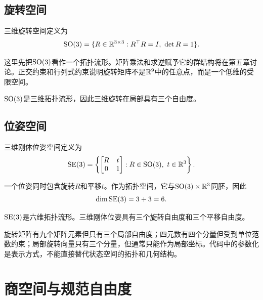 \subsection{旋转空间}

\begin{definition}[特殊正交群]
三维旋转空间定义为
\[
    \operatorname{SO}(3)
    =
    \{R\in\mathbb{R}^{3\times3}:R^\top R=I,\ \det R=1\}.
\]
\end{definition}

这里先把$\SO(3)$看作一个拓扑流形。矩阵乘法和求逆赋予它的群结构将在第五章讨论。正交约束和行列式约束说明旋转矩阵不是$\mathbb{R}^9$中的任意点，而是一个低维的受限空间。

\begin{theorem}[$\SO(3)$的维数]
$\SO(3)$是三维拓扑流形，因此三维旋转在局部具有三个自由度。
\end{theorem}

\subsection{位姿空间}

\begin{definition}[特殊欧氏群]
三维刚体位姿空间定义为
\[
    \operatorname{SE}(3)
    =
    \left\{
    \begin{bmatrix}
        R&t\\
        0&1
    \end{bmatrix}
    :
    R\in\operatorname{SO}(3),\ t\in\mathbb{R}^3
    \right\}.
\]
\end{definition}

一个位姿同时包含旋转$R$和平移$t$。作为拓扑空间，它与$\operatorname{SO}(3)\times\mathbb{R}^3$同胚，因此
\[
    \dim\operatorname{SE}(3)=3+3=6.
\]

\begin{theorem}[$\SE(3)$的维数]
$\SE(3)$是六维拓扑流形。三维刚体位姿具有三个旋转自由度和三个平移自由度。
\end{theorem}

\begin{remark}[状态表示不是状态空间本身]
旋转矩阵有九个矩阵元素但只有三个局部自由度；四元数有四个分量但受到单位范数约束；局部旋转向量只有三个分量，但通常只能作为局部坐标。代码中的参数化是表示方式，不能直接替代状态空间的拓扑和几何结构。
\end{remark}


\section{商空间与规范自由度}

